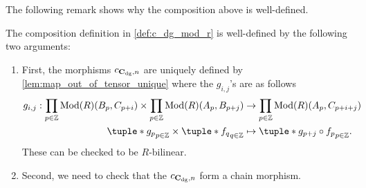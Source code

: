 The following remark shows why the composition above is well-defined.

\begin{remark}
    The composition definition in \autoref{def:c_dg_mod_r} is well-defined by the following two arguments:

    \begin{enumerate}
        \item {
            First, the morphisms \( c_{\operatorname{\mathbf{C}}_{\operatorname{dg}}, n} \) are uniquely defined by \autoref{lem:map_out_of_tensor_unique} where the \( g_{i, j} \)'s are as follows
            \begin{align*}
                g_{i, j}: \prod_{p \in \Zb} \Mod(R)(B_p, C_{p + i}) \times \prod_{p \in \Zb} \Mod(R)(A_p, B_{p + j}) &\to \prod_{p \in \Zb} \Mod(R)(A_p, C_{p + i + j}) \\
                \tuple*{ g_p }_{p \in \Zb} \times \tuple*{ f_q }_{q \in \Zb} &\mapsto \tuple*{ g_{p + j} \circ f_p }_{p \in \Zb}.
            \end{align*}
            These can be checked to be \( R \)-bilinear.
        }
        \item {
            Second, we need to check that the \( c_{\operatorname{\mathbf{C}}_{\operatorname{dg}}, n} \) form a chain morphism.

}
\end{enumerate}
\end{remark}
